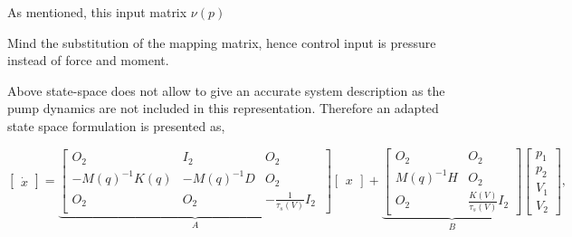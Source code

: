 As mentioned, this input matrix $\nu(p)$



Mind the substitution of the mapping matrix, hence control input is pressure instead of force and moment. 

Above state-space does not allow to give an accurate system description as the pump dynamics are not included in this representation. Therefore an adapted state space formulation is presented as,

\begin{equation}
     \begin{bmatrix} \dot{x}  \end{bmatrix}   =   \underbrace{ \begin{bmatrix} O_2 & I_2 & O_2 \\ -M(q)^{-1}K(q)  & -M(q)^{-1} D & O_2 \\
     O_2 & O_2    & -\frac{1}{\tau_s(V)}I_2\ \end{bmatrix}   }_A   \begin{bmatrix} x \end{bmatrix}  + \underbrace{      \begin{bmatrix} O_2 & O_2 \\ M(q)^{-1}H & O_2 \\ O_2 & \frac{K(V)}{\tau_s(V)} I_2 \end{bmatrix} }_B      \begin{bmatrix} p_1 \\ p_2  \\ V_1 \\ V_2 \end{bmatrix},
     \label{eq:ssp}
\end{equation}









